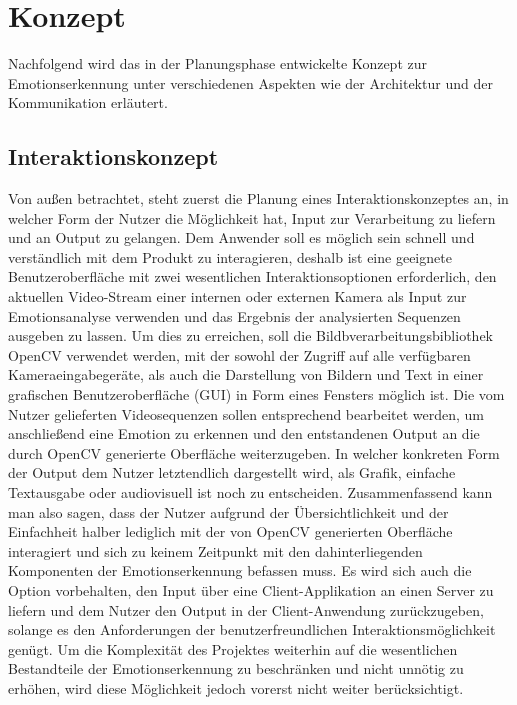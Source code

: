 \documentclass[12pt, a4paper]{scrbook}
\begin{document}
\section{Konzept}
Nachfolgend wird das in der Planungsphase entwickelte Konzept zur Emotionserkennung unter verschiedenen Aspekten wie der Architektur und der Kommunikation erläutert.

\subsection{Interaktionskonzept}
Von außen betrachtet, steht zuerst die Planung eines Interaktionskonzeptes an, in welcher Form der Nutzer die Möglichkeit hat, Input zur Verarbeitung zu liefern und an Output zu gelangen. Dem Anwender soll es möglich sein schnell und verständlich mit dem Produkt zu interagieren, deshalb ist eine geeignete Benutzeroberfläche mit zwei wesentlichen Interaktionsoptionen erforderlich, den aktuellen Video-Stream einer internen oder externen Kamera als Input zur Emotionsanalyse verwenden und das Ergebnis der analysierten Sequenzen ausgeben zu lassen. Um dies zu erreichen, soll die Bildbverarbeitungsbibliothek OpenCV verwendet werden, mit der sowohl der Zugriff auf alle verfügbaren Kameraeingabegeräte, als auch die Darstellung von Bildern und Text in einer grafischen Benutzeroberfläche (GUI) in Form eines Fensters möglich ist. Die vom Nutzer gelieferten Videosequenzen sollen entsprechend bearbeitet werden, um anschließend eine Emotion zu erkennen und den entstandenen Output an die durch OpenCV generierte Oberfläche weiterzugeben. In welcher konkreten Form der Output dem Nutzer letztendlich dargestellt wird, als Grafik, einfache Textausgabe oder audiovisuell ist noch zu entscheiden.\newline
Zusammenfassend kann man also sagen, dass der Nutzer aufgrund der Übersichtlichkeit und der Einfachheit halber lediglich mit der von OpenCV generierten Oberfläche interagiert und sich zu keinem Zeitpunkt mit den dahinterliegenden Komponenten der Emotionserkennung befassen muss.\newline
Es wird sich auch die Option vorbehalten, den Input über eine Client-Applikation an einen Server zu liefern und dem Nutzer den Output in der Client-Anwendung zurückzugeben, solange es den Anforderungen der benutzerfreundlichen Interaktionsmöglichkeit genügt. Um die Komplexität des Projektes weiterhin auf die wesentlichen Bestandteile der Emotionserkennung zu beschränken und nicht unnötig zu erhöhen, wird diese Möglichkeit jedoch vorerst nicht weiter berücksichtigt.
\end{document}
